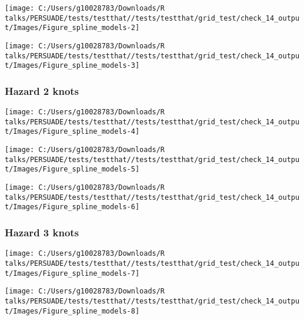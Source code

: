 \documentclass[
]{article}
\begin{document}
\begin{flushleft}\texttt{[image: C:/Users/g10028783/Downloads/R talks/PERSUADE/tests/testthat//tests/testthat/grid\_test/check\_14\_output/Images/Figure\_spline\_models-2]} \end{flushleft}

\begin{flushleft}\texttt{[image: C:/Users/g10028783/Downloads/R talks/PERSUADE/tests/testthat//tests/testthat/grid\_test/check\_14\_output/Images/Figure\_spline\_models-3]} \end{flushleft}

\clearpage

\subsubsection{Hazard 2 knots}\label{hazard-2-knots}

\begin{flushleft}\texttt{[image: C:/Users/g10028783/Downloads/R talks/PERSUADE/tests/testthat//tests/testthat/grid\_test/check\_14\_output/Images/Figure\_spline\_models-4]} \end{flushleft}

\begin{flushleft}\texttt{[image: C:/Users/g10028783/Downloads/R talks/PERSUADE/tests/testthat//tests/testthat/grid\_test/check\_14\_output/Images/Figure\_spline\_models-5]} \end{flushleft}

\begin{flushleft}\texttt{[image: C:/Users/g10028783/Downloads/R talks/PERSUADE/tests/testthat//tests/testthat/grid\_test/check\_14\_output/Images/Figure\_spline\_models-6]} \end{flushleft}

\clearpage

\subsubsection{Hazard 3 knots}\label{hazard-3-knots}

\begin{flushleft}\texttt{[image: C:/Users/g10028783/Downloads/R talks/PERSUADE/tests/testthat//tests/testthat/grid\_test/check\_14\_output/Images/Figure\_spline\_models-7]} \end{flushleft}

\begin{flushleft}\texttt{[image: C:/Users/g10028783/Downloads/R talks/PERSUADE/tests/testthat//tests/testthat/grid\_test/check\_14\_output/Images/Figure\_spline\_models-8]} \end{flushleft}
\end{document}

